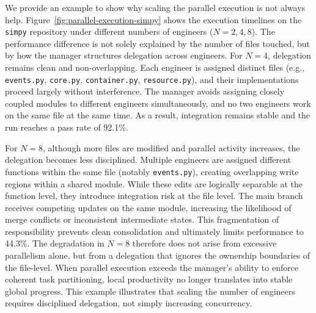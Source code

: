 We provide an example to show why scaling the parallel execution is not always help. Figure~\ref{fig:parallel-execution-simpy} shows the execution timelines on the \texttt{simpy} repository under different numbers of engineers ($N=2,4,8$). The performance difference is not solely explained by the number of files touched, but by how the manager structures delegation across engineers. For $N=4$, delegation remains clean and non-overlapping. Each engineer is assigned distinct files (e.g., \texttt{events.py}, \texttt{core.py}, \texttt{container.py}, \texttt{resource.py}), and their implementations proceed largely without interference. The manager avoids assigning closely coupled modules to different engineers simultaneously, and no two engineers work on the same file at the same time. As a result, integration remains stable and the run reaches a pass rate of 92.1\%.

For $N=8$, although more files are modified and parallel activity increases, the delegation becomes less disciplined. Multiple engineers are assigned different functions within the same file (notably \texttt{events.py}), creating overlapping write regions within a shared module. While these edits are logically separable at the function level, they introduce integration risk at the file level. The main branch receives competing updates on the same module, increasing the likelihood of merge conflicts or inconsistent intermediate states. This fragmentation of responsibility prevents clean consolidation and ultimately limits performance to 44.3\%. The degradation in $N=8$ therefore does not arise from excessive parallelism alone, but from a delegation that ignores the ownership boundaries of the file-level. When parallel execution exceeds the manager’s ability to enforce coherent task partitioning, local productivity no longer translates into stable global progress. This example illustrates that scaling the number of engineers requires disciplined delegation, not simply increasing concurrency.